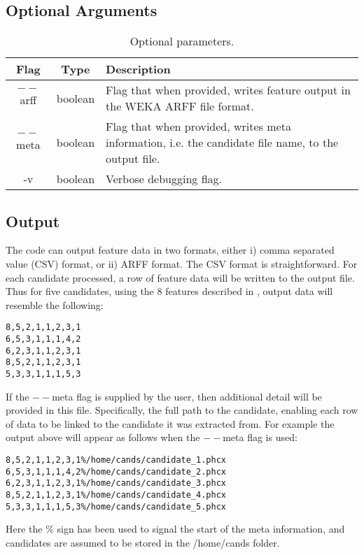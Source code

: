 \documentclass[twoside,a4paper]{refart}
\begin{document}
\subsection{Optional Arguments}
\begin{table}[h]
\begin{tabular}{|c|c|p{7cm}|}
\hline
Flag & Type    & Description                                     \\ \hline\hline
$--$arff   & boolean  & Flag that when provided, writes feature output in the WEKA ARFF file format.\\ \hline
$--$meta   & boolean  & Flag that when provided, writes meta information, i.e. the candidate file name, to the output file.    \\ \hline
-v       & boolean  & Verbose debugging flag. \\ \hline
\end{tabular}
\caption[]{Optional parameters.}
\label{tab:optionalParameters}
\end{table}

\subsection{Output}
The code can output feature data in two formats, either i) comma separated value (CSV) format, or ii) ARFF format. The CSV format is straightforward. For each candidate processed, a row of feature data will be written to the output file. Thus for five candidates, using the 8 features described in \cite{Lyon:2015:jk}, output data will resemble the following:
\begin{lstlisting}[caption={Feature data output in CSV format.},label=listing_2]
8,5,2,1,1,2,3,1
6,5,3,1,1,1,4,2
6,2,3,1,1,2,3,1
8,5,2,1,1,2,3,1
5,3,3,1,1,1,5,3
\end{lstlisting}

If the $--$meta flag is supplied by the user, then additional detail will be provided in this file. Specifically, the full path to the candidate, enabling each row of data to be linked to the candidate it was extracted from. For example the output above will appear as follows when the $--$meta flag is used:
\begin{lstlisting}[caption={Feature data output in CSV format, with meta information.}]
8,5,2,1,1,2,3,1%/home/cands/candidate_1.phcx
6,5,3,1,1,1,4,2%/home/cands/candidate_2.phcx
6,2,3,1,1,2,3,1%/home/cands/candidate_3.phcx
8,5,2,1,1,2,3,1%/home/cands/candidate_4.phcx
5,3,3,1,1,1,5,3%/home/cands/candidate_5.phcx
\end{lstlisting}
Here the \% sign has been used to signal the start of the meta information, and candidates are assumed to be stored in the /home/cands folder.\newpage
\end{document}
